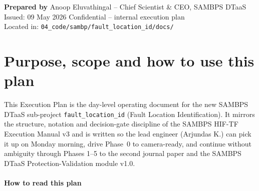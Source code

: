 \documentclass[11pt,a4paper]{article}
\begin{document}
\begin{titlepage}
\vfill
\noindent\colorbox{sambplight}{\parbox{\dimexpr\textwidth-2\fboxsep\relax}{%
  \vspace{0.15cm}
  \color{sambpblue}\textbf{Prepared by} Anoop Eluvathingal -- Chief Scientist \& CEO, SAMBPS DTaaS\\[1pt]
  \color{sambpgrey}\small Issued: 09 May 2026 \quad\textbar\quad Confidential -- internal execution plan\\[1pt]
  \small Located in: \texttt{04\_code/sambp/fault\_location\_id/docs/}
  \vspace{0.15cm}
}}
\end{titlepage}

\tableofcontents
\newpage

\section{Purpose, scope and how to use this plan}

This Execution Plan is the day-level operating document for the new
SAMBPS DTaaS sub-project \texttt{fault\_location\_id} (Fault Location
Identification).  It mirrors the structure, notation and decision-gate
discipline of the SAMBPS HIF-TF Execution Manual v3 and is written so the
lead engineer (Arjundas K.) can pick it up on Monday morning, drive
Phase~0 to camera-ready, and continue without ambiguity through Phases
1--5 to the second journal paper and the SAMBPS DTaaS Protection-Validation
module v1.0.

\paragraph{How to read this plan}
\end{document}
